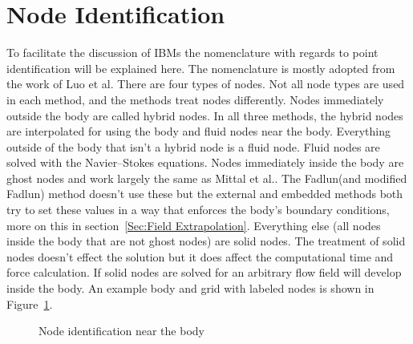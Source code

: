 \section{Node Identification}
To facilitate the discussion of IBMs the nomenclature with regards to point identification will be explained here. 
The nomenclature is mostly adopted from the work of Luo et al.\cite{Luo:2012gx}
There are four types of nodes. 
Not all node types are used in each method, and the methods treat nodes differently. 
Nodes immediately outside the body are called hybrid nodes. 
In all three methods, the hybrid nodes are interpolated for using the body and fluid nodes near the body. 
Everything outside of the body that isn't a hybrid node is a fluid node. 
Fluid nodes are solved with the Navier--Stokes equations. 
Nodes immediately inside the body are ghost nodes and work largely the same as Mittal et al.\cite{Mittal:2005ii}. 
The Fadlun(and modified Fadlun) method doesn't use these but the external and embedded methods both try to set these values in a way that enforces the body's boundary conditions, more on this in section~\ref{Sec:Field Extrapolation}. 
Everything else (all nodes inside the body that are not ghost nodes) are solid nodes. 
The treatment of solid nodes doesn't effect the solution but it does affect the computational time and force calculation.
If solid nodes are solved for an arbitrary flow field will develop inside the body. 
An example body and grid with labeled nodes is shown in Figure~\ref{fig:node id}. 

\begin{figure}[!htb]
	\centering
	
	\caption{Node identification near the body}
	\label{fig:node id}
\end{figure}


